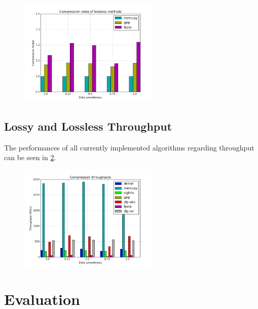 \documentclass[
	12pt,
	a4paper,
	BCOR10mm,
	DIV14,
	headsepline,
]{scrreprt}
\begin{document}
\begin{figure}[H]
	\centering
	\includegraphics[width=0.6\textwidth]{c_rates_lossless.png}
	\caption{}
	\label{fig:lossless_rates}
\end{figure}

\subsection{Lossy and Lossless Throughput}

\bigskip

The performances of all currently implemented algorithms regarding throughput
can be seen in \ref{fig:through}.

\begin{figure}[H]
	\centering
	\includegraphics[width=0.6\textwidth]{throughputs.png}
	\caption{}
	\label{fig:through}
\end{figure}

\clearpage

\section{Evaluation}

\bigskip
\end{document}

